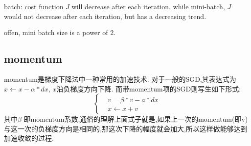batch: cost function $J$ will decrease after each iteration.
while mini-batch, $J$ would not decrease after each iteration, but has a decreasing trend.

offen, mini batch size is a power of $2$.

\subsection{momentum}
momentum是梯度下降法中一种常用的加速技术.
对于一般的SGD,其表达式为$x \leftarrow  x-\alpha \ast dx$, $x$沿负梯度方向下降.
而带momentum项的SGD则写生如下形式:
$$
\left\{
\begin{aligned}
	& v = \beta \ast v - a \ast dx \\
	& x \leftarrow x + v
\end{aligned}
\right.
$$
其中$\beta$ 即momentum系数,通俗的理解上面式子就是,如果上一次的momentum(即v)与这一次的负梯度方向是相同的,那这次下降的幅度就会加大,所以这样做能够达到加速收敛的过程.

